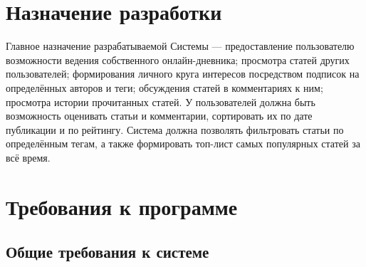 \documentclass{bmstu-gost-7-32}
\begin{document}
\section{Назначение разработки}



Главное назначение разрабатываемой Системы — предоставление пользователю возможности ведения собственного онлайн-дневника; просмотра статей других пользователей; формирования личного круга интересов посредством подписок на определённых авторов и теги; обсуждения статей в комментариях к ним; просмотра истории прочитанных статей.
У пользователей должна быть возможность оценивать статьи и комментарии, сортировать их по дате публикации и по рейтингу.
Система должна позволять фильтровать статьи по определённым тегам, а также формировать топ-лист самых популярных статей за всё время.

\section{Требования к программе} %

\subsection{Общие требования к системе}

\end{document}
